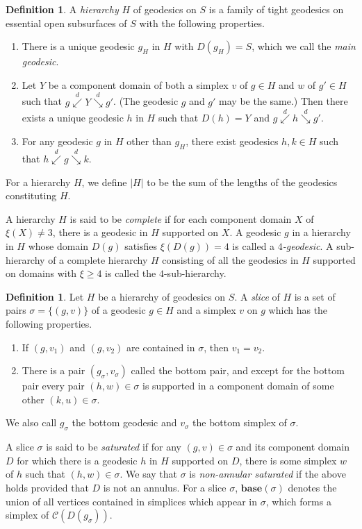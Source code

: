 \documentclass{amsart}
\theoremstyle{definition}
\newtheorem{definition}[theorem]{Definition}
\numberwithin{figure}{section}
\numberwithin{equation}{section}
\newcommand{\blackboard}[1]{\ensuremath{\mathbb{#1}}}
\newcommand{\complexes}{\blackboard{C}}
\newcommand{\subord}{\overset{d}{\searrow}}
\newcommand{\supord}{\overset{d}{\swarrow}}
\def\cc{\complexes}
\def\cc{\mathcal{C}}
\begin{document}
\begin{definition}
A {\em hierarchy} $H$ of geodesics on $S$ is a family of tight geodesics on essential open subsurfaces of $S$ with the following properties.
\begin{enumerate}
\item There is a unique geodesic $g_H$ in $H$ with $D(g_H)=S$, which we call the {\em main geodesic}.
\item Let $Y$ be a component domain of both a simplex $v$ of $g \in H$  and $w$ of $g' \in H$ such that $g \supord Y \subord g'$.
(The geodesic $g$ and $g'$ may be the same.)
Then there exists a unique geodesic $h$ in $H$ such that $D(h)=Y$ and $g \supord h \subord g'$.
\item For any geodesic $g$ in $H$ other than $g_H$, there exist geodesics $h, k \in H$ such that $h \supord g \subord k$.
\end{enumerate}
For a hierarchy $H$, we define $|H|$ to be the sum of the lengths of the geodesics constituting $H$.
\end{definition}
A hierarchy $H$ is said to be {\em complete} if for each component domain $X$ of $\xi(X) \neq 3$, there is a geodesic in $H$ supported on $X$.
A geodesic $g$ in a hierarchy in $H$ whose domain $D(g)$ satisfies $\xi(D(g))=4$ is called a {\em $4$-geodesic}.
A sub-hierarchy of a complete hierarchy $H$ consisting of all the geodesics in $H$ supported on domains with $\xi \geq 4$ is called the $4$-sub-hierarchy.


\begin{definition}
\label{slice}
Let $H$ be a hierarchy of geodesics on $S$.
A {\em slice} of $H$ is a set of pairs $\sigma=\{(g,v)\}$ of a geodesic $g \in H$ and a simplex $v$ on $g$ which has the following properties.
\begin{enumerate}
\item If $(g,v_1)$ and $(g,v_2)$ are contained in $\sigma$, then $v_1=v_2$.
\item There is a pair $(g_\sigma, v_\sigma)$ called the bottom pair, and except for the bottom pair every pair $(h,w) \in \sigma$ is supported in a component domain of some other $(k, u) \in \sigma$.
\end{enumerate}
We also call $g_\sigma$ the bottom geodesic and $v_\sigma$ the bottom simplex of $\sigma$.

A slice $\sigma$ is said to be {\em saturated} if for any $(g,v) \in \sigma$ and its component domain $D$ for which there is a geodesic $h$ in $H$ supported on $D$, there is some simplex $w$ of $h$ such that $(h, w) \in \sigma$.
We say that $\sigma$ is {\em non-annular saturated} if the above holds provided that $D$ is not an annulus.
For a slice $\sigma$, $\mathbf{base}(\sigma)$ denotes the union of all vertices contained in simplices which appear in $\sigma$, which forms a simplex of $\cc(D(g_\sigma))$.
\end{definition} 
\end{document}

